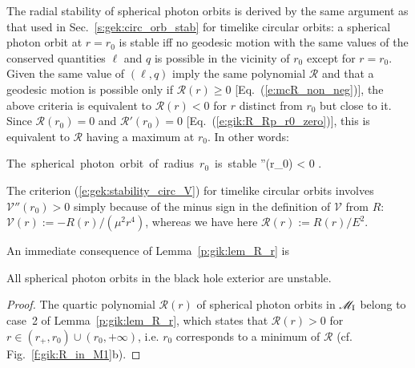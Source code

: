 The radial stability of spherical photon orbits is derived by the same
argument as that used in Sec.~\ref{s:gek:circ_orb_stab} for timelike circular
orbits: a spherical photon orbit at $r=r_0$ is
stable iff no geodesic motion with the same values of the
conserved quantities $\ell$ and $q$
is possible in the vicinity of $r_0$ except for $r=r_0$. Given
the same value of $(\ell,q)$ imply the same polynomial $\mathcal{R}$ and
that a geodesic
motion is possible only if $\mathcal{R}(r) \geq 0$ [Eq.~(\ref{e:mcR_non_neg})],
the above criteria is equivalent to $\mathcal{R}(r) < 0$
for $r$ distinct from $r_0$ but close to it. Since $\mathcal{R}(r_0) = 0$
and $\mathcal{R}'(r_0) = 0$ [Eq.~(\ref{e:gik:R_Rp_r0_zero})], this is equivalent
to $\mathcal{R}$ having a maximum at $r_0$. In other words:
\begin{prop}
\be \label{e:gik:stability_spher}
    \mbox{The spherical photon orbit of radius $r_0$ is stable} \iff
    ''(r_0) < 0 .
\ee
\end{prop}
\begin{remark}
The criterion (\ref{e:gek:stability_circ_V}) for timelike circular orbits involves
$\mathcal{V}''(r_0) > 0$ simply because
of the minus sign in the definition of $\mathcal{V}$ from $R$:
$\mathcal{V}(r) := - R(r) / (\mu^2 r^4)$, whereas we have here
$\mathcal{R}(r) := R(r)/E^2$.
\end{remark}

An immediate consequence of Lemma~\ref{p:gik:lem_R_r} is
\begin{prop}
All spherical photon orbits in the black hole exterior are unstable.
\end{prop}
\begin{proof}
The quartic polynomial $\mathcal{R}(r)$ of spherical photon orbits in $\mathscr{M}_{\rm I}$
belong to case~2 of Lemma~\ref{p:gik:lem_R_r}, which states that $\mathcal{R}(r)>0$ for $r\in (r_+, r_0)\cup(r_0, +\infty)$,
i.e. $r_0$ corresponds to a minimum of $\mathcal{R}$ (cf. Fig.~\ref{f:gik:R_in_M1}b).
\end{proof}

